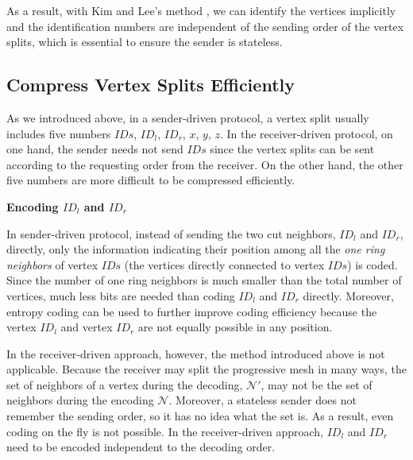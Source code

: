     As a result, with Kim and Lee's method \cite{kim01truly}, we can identify the vertices
    implicitly and the identification numbers are independent of the sending order of the 
    vertex splits, which is essential to ensure the sender is stateless.

    \subsection{Compress Vertex Splits Efficiently}
    As we introduced above, in a sender-driven protocol, 
    a vertex split usually includes five numbers {$IDs$, $ID_l$, $ID_r$,
    $x$, $y$, $z$}. 
    In the receiver-driven protocol, on one hand, the sender needs not send
    $IDs$ since the vertex splits can be sent according to
    the requesting order from the receiver. On the other hand, the other 
    five numbers are more difficult to be compressed efficiently.
    
    \textbf{Encoding $ID_l$ and $ID_r$}

    In sender-driven protocol, instead of sending the two cut neighbors, $ID_l$ and $ID_r$, directly,
    only the information indicating their position among all the \emph{one ring neighbors}
    of vertex $IDs$ (the vertices directly connected to vertex $IDs$) is coded.  
    Since the number of one ring neighbors is much smaller than the total number of vertices,
    much less bits are needed than coding $ID_l$ and $ID_r$ directly. Moreover, entropy coding
    can be used to further improve coding efficiency because the vertex $ID_l$ and vertex $ID_r$
    are not equally possible in any position.

    In the receiver-driven approach, however, the method introduced above is not applicable.
    Because the receiver may split the progressive mesh in many ways, the set of neighbors of 
    a vertex during the decoding, $\mathcal{N}'$, 
    may not be the set of neighbors during the encoding $\mathcal{N}$.
    Moreover, a stateless sender does not remember the sending
    order, so it has no idea what the set is. 
    As a result, even coding on the fly is not possible. 
    In the receiver-driven approach, $ID_l$ and $ID_r$ need to be encoded independent to the decoding order. 

